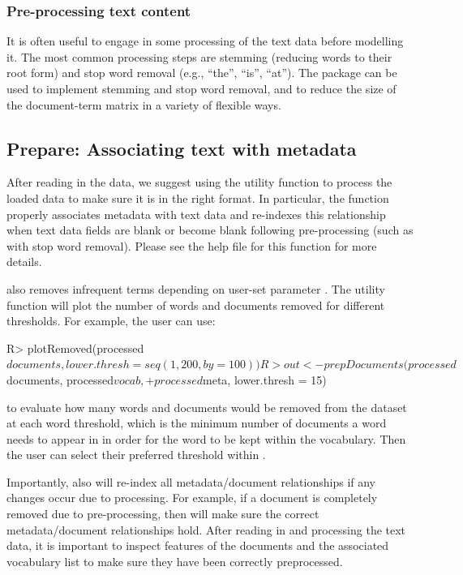 \documentclass[article,shortnames]{jss}
\begin{document}
\subsubsection{Pre-processing text content}

It is often useful to engage in some processing of the text data before modelling it. The most common processing steps are stemming (reducing words to their root form) and stop word removal (e.g., ``the'', ``is'', ``at'').  The  package can be used to implement stemming and stop word removal, and to reduce the size of the document-term matrix in a variety of flexible ways. 


\subsection{Prepare: Associating text with metadata}


After reading in the data, we suggest using the utility function  to process the loaded data to make sure it is in the right format. In particular, the  function properly associates metadata with text data and re-indexes this relationship when text data fields are blank or become blank following pre-processing (such as with stop word removal). Please see the help file for this function for more details.

 also removes infrequent terms depending on user-set parameter . The utility function  will plot the number of words and documents removed for different thresholds. For example, the user can use:

\begin{Schunk}
\begin{Sinput}
R> plotRemoved(processed$documents, lower.thresh = seq(1, 200, by = 100))
R> out <- prepDocuments(processed$documents, processed$vocab,
+  processed$meta, lower.thresh = 15)
\end{Sinput}
\end{Schunk}

to evaluate how many words and documents would be removed from the dataset at each word threshold, which is the minimum number of documents a word needs to appear in in order for the word to be kept within the vocabulary.  Then the user can select their preferred threshold within .
 

 


Importantly,  also will re-index all metadata/document relationships if any changes occur due to processing. For example, if a document is completely removed due to pre-processing, then  will make sure the correct metadata/document relationships hold. After reading in and processing the text data, it is important to inspect features of the documents and the associated vocabulary list to make sure they have been correctly preprocessed.
\end{document}
